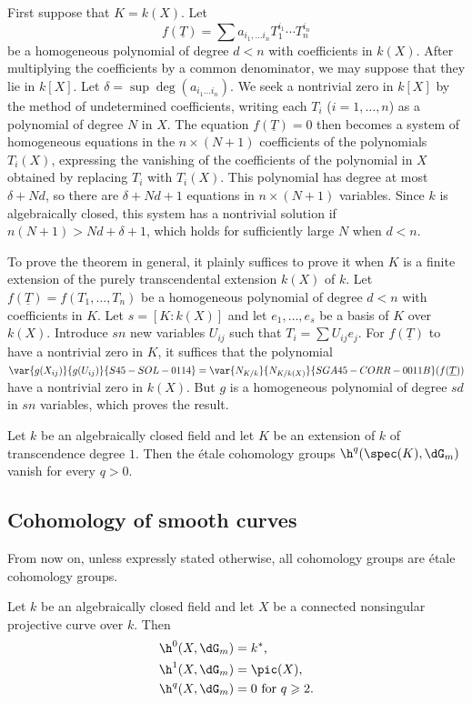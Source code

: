 First suppose that $K=k(X)$. Let
\[
  f(\underline T) = \sum a_{i_1,\dotsc i_n} T_1^{i_1} \dotsm T_n^{i_n}
\]
be a homogeneous polynomial of degree $d<n$ with coefficients in
$k(X)$. After multiplying the coefficients by a common denominator, we
may suppose that they lie in $k[X]$. Let
$\delta=\sup\deg(a_{i_1\dotsc i_n})$. We seek a nontrivial zero in
$k[X]$ by the method of undetermined coefficients, writing each $T_i$
($i=1,\dotsc,n$) as a polynomial of degree $N$ in $X$. The equation
$f(\underline T)=0$ then becomes a system of homogeneous equations in the
$n\times(N+1)$ coefficients of the polynomials $T_i(X)$, expressing the
vanishing of the coefficients of the polynomial in $X$ obtained by
replacing $T_i$ with $T_i(X)$. This polynomial has degree at most
$\delta+Nd$, so there are $\delta+Nd+1$ equations in
$n\times(N+1)$ variables. Since $k$ is algebraically closed, this system
has a nontrivial solution if $n(N+1)>Nd+\delta+1$, which holds for
sufficiently large $N$ when $d<n$.

To prove the theorem in general, it plainly suffices to prove it when
$K$ is a finite extension of the purely transcendental extension
$k(X)$ of $k$. Let $f(\underline T)=f(T_1,\dotsc,T_n)$ be a homogeneous
polynomial of degree $d<n$ with coefficients in $K$. Let
$s=[K:k(X)]$ and let $e_1,\dotsc,e_s$ be a basis of $K$ over $k(X)$.
Introduce $sn$ new variables $U_{ij}$ such that
$T_i=\sum U_{ij}e_j$. For $f(\underline T)$ to have a nontrivial zero in $K$, it
suffices that the polynomial $\var{g(X_{ij})}{g(U_{ij})}{S45-SOL-0114}=\var{N_{K/k}}{N_{K/k(X)}}{SGA45-CORR-0011B}(f(\underline T))$ have a nontrivial
zero in $k(X)$. But $g$ is a homogeneous polynomial of degree $sd$ in $sn$
variables, which proves the result.

\begin{corollary}\label{I:3-2-4}
Let $k$ be an algebraically closed field and let $K$ be an extension of
$k$ of transcendence degree $1$. Then the étale cohomology groups
$\h^q(\spec(K),\dG_m)$ vanish for every $q>0$.
\end{corollary}

\subsection{Cohomology of smooth curves}\label{I:3-3}

From now on, unless expressly stated otherwise, all cohomology groups are
étale cohomology groups.

\begin{proposition}\label{I:3-3-1}
Let $k$ be an algebraically closed field and let $X$ be a connected
nonsingular projective curve over $k$. Then
\begin{align*}
  \h^0(X,\dG_m) &= k^* \text{,} \\
  \h^1(X,\dG_m) &= \pic(X) \text{,} \\
  \h^q(X,\dG_m) &= 0 \text{ for $q\geqslant 2$.}
\end{align*}
\end{proposition}

